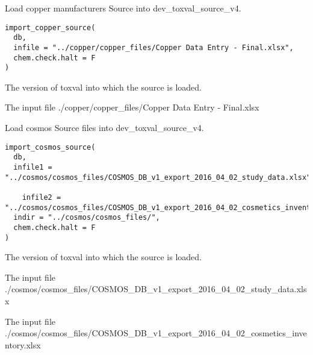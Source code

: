 \documentclass[letterpaper]{book}
\begin{document}
%
\begin{Description}\relax
Load copper manufacturers Source into dev\_toxval\_source\_v4.
\end{Description}
%
\begin{Usage}
\begin{verbatim}
import_copper_source(
  db,
  infile = "../copper/copper_files/Copper Data Entry - Final.xlsx",
  chem.check.halt = F
)
\end{verbatim}
\end{Usage}
%
\begin{Arguments}
\begin{ldescription}
\item[\code{db}] The version of toxval into which the source is loaded.

\item[\code{infile}] The input file ./copper/copper\_files/Copper Data Entry - Final.xlsx
\end{ldescription}
\end{Arguments}
%
\begin{Description}\relax
Load cosmos Source files into dev\_toxval\_source\_v4.
\end{Description}
%
\begin{Usage}
\begin{verbatim}
import_cosmos_source(
  db,
  infile1 = "../cosmos/cosmos_files/COSMOS_DB_v1_export_2016_04_02_study_data.xlsx",
 
    infile2 = "../cosmos/cosmos_files/COSMOS_DB_v1_export_2016_04_02_cosmetics_inventory.xlsx",
  indir = "../cosmos/cosmos_files/",
  chem.check.halt = F
)
\end{verbatim}
\end{Usage}
%
\begin{Arguments}
\begin{ldescription}
\item[\code{db}] The version of toxval into which the source is loaded.

\item[\code{infile1}] The input file ./cosmos/cosmos\_files/COSMOS\_DB\_v1\_export\_2016\_04\_02\_study\_data.xlsx

\item[\code{infile2}] The input file ./cosmos/cosmos\_files/COSMOS\_DB\_v1\_export\_2016\_04\_02\_cosmetics\_inventory.xlsx
\end{ldescription}
\end{Arguments}
\end{document}
